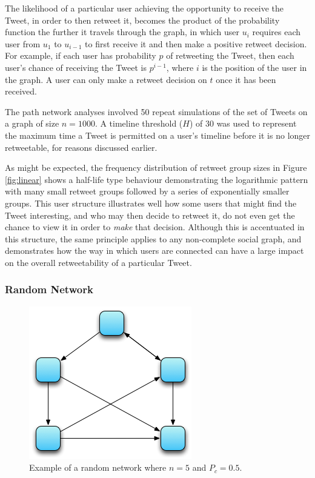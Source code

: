 The likelihood of a particular user achieving the opportunity to receive the Tweet, in order to then retweet it, becomes the product of the probability function the further it travels through the graph, in which user $u_i$ requires each user from $u_1$ to $u_{i-1}$ to first receive it and then make a positive retweet decision. For example, if each user has probability $p$ of retweeting the Tweet, then each user's chance of receiving the Tweet is $p^{i-1}$, where $i$ is the position of the user in the graph. A user can only make a retweet decision on $t$ once it has been received.

The path network analyses involved 50 repeat simulations of the set of Tweets on a graph of size $n = 1000$. A timeline threshold ($H$) of 30 was used to represent the maximum time a Tweet is permitted on a user's timeline before it is no longer retweetable, for reasons discussed earlier. 

As might be expected, the frequency distribution of retweet group sizes in Figure \ref{fig:linear} shows a half-life type behaviour demonstrating the logarithmic pattern with many small retweet groups followed by a series of exponentially smaller groups. This user structure illustrates well how some users that might find the Tweet interesting, and who may then decide to retweet it, do not even get the chance to view it in order to \textit{make} that decision. Although this is accentuated in this structure, the same principle applies to any non-complete social graph, and demonstrates how the way in which users are connected can have a large impact on the overall retweetability of a particular Tweet.


\subsubsection{Random Network}

\begin{figure}[h]
\centering
\includegraphics[scale=0.8]{4.Chapter2/Media/random_network.png} 
\caption{Example of a random network where $n = 5$ and $P_c = 0.5$.}
\label{fig:path_network}
\end{figure}

